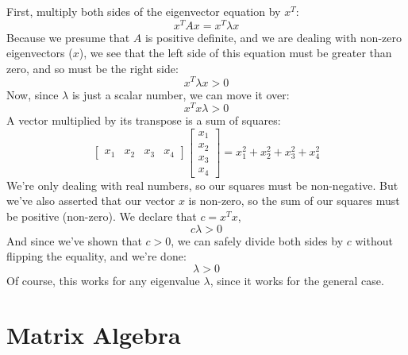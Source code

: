 \documentclass[11pt]{report}
\begin{document}
First, multiply both sides of the eigenvector equation by $x^T$:
\[ x^TAx = x^T\lambda x \]
Because we presume that $A$ is positive definite, and we are dealing with non-zero eigenvectors ($x$), we see that the left side of this equation must be greater than zero, and so must be the right side:
\[ x^T\lambda x > 0 \]
Now, since $\lambda$ is just a scalar number, we can move it over:
\[ x^Tx\lambda > 0 \]
A vector multiplied by its transpose is a sum of squares:
\[
  \begin{bmatrix}
    x_1 & x_2 & x_3 & x_4
  \end{bmatrix}
  \begin{bmatrix}
    x_1 \\ x_2 \\ x_3 \\ x_4
  \end{bmatrix}
  =
  x_1^2 + x_2^2 + x_3^2 + x_4^2
\]
We're only dealing with real numbers, so our squares must be non-negative. But we've also asserted that our vector $x$ is non-zero, so the sum of our squares must be positive (non-zero). We declare that $c = x^Tx$,
\[ c\lambda > 0 \]
And since we've shown that $c > 0$, we can safely divide both sides by $c$ without flipping the equality, and we're done:
\[ \lambda > 0 \]
Of course, this works for any eigenvalue $\lambda$, since it works for the general case.


\section{Matrix Algebra}
\end{document}
